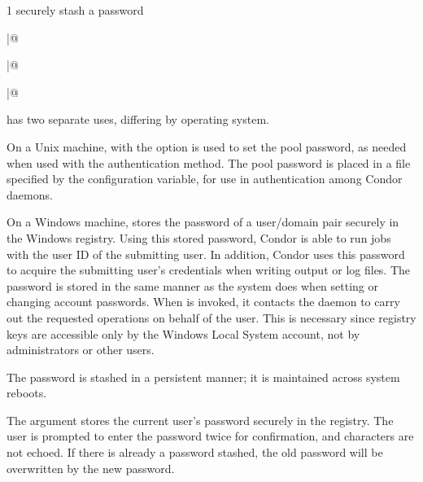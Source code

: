 \begin{ManPage}{\label{man-condor-store-cred}}{1}
{securely stash a password}
\Synopsis
{}

\Lbr
{} \verb@|@ 
\Rbr 
{}

\Lbr
{} \verb@|@ 
\Rbr 
{}

\Lbr
{} \verb@|@ 
\Rbr 
{}


\Description 

 has two separate uses,
differing by operating system.

On a Unix machine, 
 with the  option is used to set
the pool password,
as needed when used with the  authentication method.
The pool password is placed in a file specified by 
the  configuration variable,
for use in  authentication among Condor daemons.

On a Windows machine,  stores the password
of a user/domain pair securely in the Windows registry.
Using this stored password, Condor is able to
run jobs with the user ID of the submitting user.
In addition, Condor uses this password to
acquire the submitting user's credentials when writing output or log
files. The password is stored in the same manner as the system does when
setting or changing account passwords.
When  is invoked, it contacts the 
daemon to carry out the requested operations on behalf of the user.
This is necessary since registry keys are accessible only by the Windows
Local System account, not by administrators or other users.

The password is stashed in a persistent manner; it is maintained
across system reboots.

The  argument stores the current user's password securely
in the registry. The user is prompted to enter the password
twice for confirmation, and characters are not echoed.	If there
is already a password stashed, the old password will be
overwritten by the new password.


\end{ManPage}
